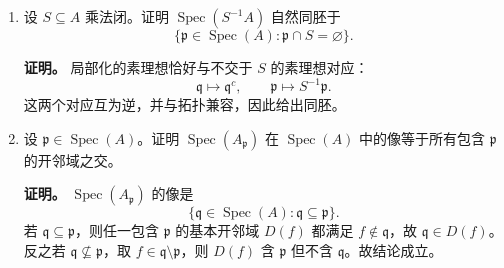 \documentclass[a4paper]{ctexart}
\begin{document}
\begin{enumerate}[leftmargin=*, label=\textbf{3.\arabic*.}]
\begin{enumerate}[label=(\roman*)]
\item
\[
(A/\mathfrak a)_{\mathfrak p}=0 \iff \mathfrak a\not\subseteq \mathfrak p,
\]
故支撑恰为 \(V(\mathfrak a)\)。

\item 局部化保持正合，因此逐点判断即可。

\item 因为局部化与直和可交换。

\item 由 Proposition 3.14，
\[
\operatorname{Ann}(M_{\mathfrak p})=A_{\mathfrak p}\operatorname{Ann}(M),
\]
故
\[
M_{\mathfrak p}=0 \iff \operatorname{Ann}(M)\not\subseteq \mathfrak p.
\]

\item 对每个 \(\mathfrak p\),
\[
(M\otimes_A N)_{\mathfrak p}\cong M_{\mathfrak p}\otimes_{A_{\mathfrak p}}N_{\mathfrak p}.
\]
若两者都非零且有限生成，则在局部环 \(A_{\mathfrak p}\) 上张量积仍非零。

\item 由
\[
M/\mathfrak aM \cong (A/\mathfrak a)\otimes_A M
\]
和上一条得到
\[
\operatorname{Supp}(M/\mathfrak aM)=V(\mathfrak a)\cap V(\operatorname{Ann}(M))
=V(\mathfrak a+\operatorname{Ann}(M)).
\]
\end{enumerate}

\setcounter{enumi}{20}
\item 设 \(S\subseteq A\) 乘法闭。证明 \(\operatorname{Spec}(S^{-1}A)\) 自然同胚于
\[
\{\mathfrak p\in \operatorname{Spec}(A):\mathfrak p\cap S=\varnothing\}.
\]

\textbf{证明。}
局部化的素理想恰好与不交于 \(S\) 的素理想对应：
\[
\mathfrak q\longmapsto \mathfrak q^c,\qquad
\mathfrak p\longmapsto S^{-1}\mathfrak p.
\]
这两个对应互为逆，并与拓扑兼容，因此给出同胚。

\setcounter{enumi}{21}
\item 设 \(\mathfrak p\in\operatorname{Spec}(A)\)。证明 \(\operatorname{Spec}(A_{\mathfrak p})\) 在 \(\operatorname{Spec}(A)\) 中的像等于所有包含 \(\mathfrak p\) 的开邻域之交。

\textbf{证明。}
\(\operatorname{Spec}(A_{\mathfrak p})\) 的像是
\[
\{\mathfrak q\in\operatorname{Spec}(A):\mathfrak q\subseteq \mathfrak p\}.
\]
若 \(\mathfrak q\subseteq \mathfrak p\)，则任一包含 \(\mathfrak p\) 的基本开邻域 \(D(f)\) 都满足 \(f\notin\mathfrak q\)，故 \(\mathfrak q\in D(f)\)。反之若 \(\mathfrak q\not\subseteq \mathfrak p\)，取 \(f\in\mathfrak q\setminus\mathfrak p\)，则 \(D(f)\) 含 \(\mathfrak p\) 但不含 \(\mathfrak q\)。故结论成立。
\end{enumerate}
\end{document}
